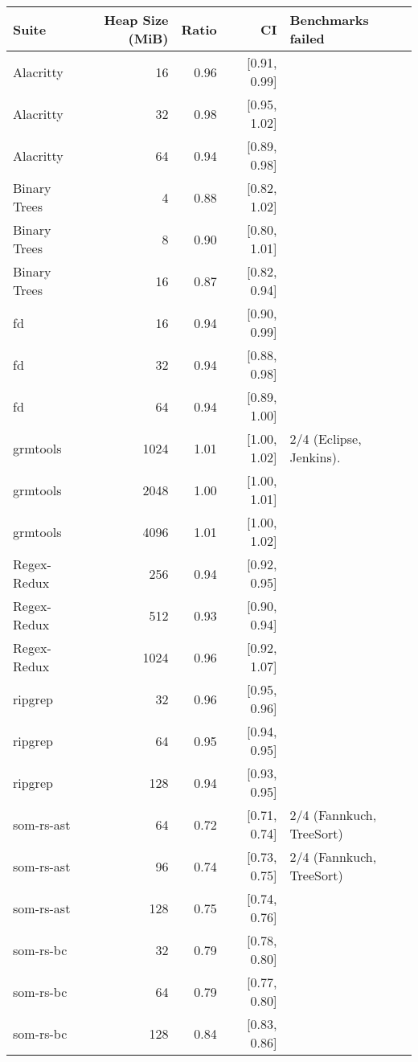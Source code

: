 \begin{tabular}{lrrrl}
    Suite         & Heap Size (MiB) & Ratio & CI & Benchmarks failed \\
\hline
Alacritty      & 16  & 0.96 & \scriptsize\textcolor{gray!60}{[0.91, 0.99]} & \\
Alacritty      & 32  & 0.98 & \scriptsize\textcolor{gray!60}{[0.95, 1.02]} & \\
Alacritty      & 64 & 0.94 & \scriptsize\textcolor{gray!60}{[0.89, 0.98]} & \\
\midrule
Binary Trees   & 4  & 0.88 & \scriptsize\textcolor{gray!60}{[0.82, 1.02]} & \\
Binary Trees   & 8  & 0.90 & \scriptsize\textcolor{gray!60}{[0.80, 1.01]} & \\
Binary Trees   & 16 & 0.87 & \scriptsize\textcolor{gray!60}{[0.82, 0.94]} & \\
\midrule
fd             & 16  & 0.94 & \scriptsize\textcolor{gray!60}{[0.90, 0.99]} & \\
fd             & 32  & 0.94 & \scriptsize\textcolor{gray!60}{[0.88, 0.98]} & \\
fd             & 64 & 0.94 & \scriptsize\textcolor{gray!60}{[0.89, 1.00]} & \\
\midrule
grmtools       & 1024  & 1.01 & \scriptsize\textcolor{gray!60}{[1.00, 1.02]} & 2/4 (Eclipse, Jenkins).  \\
grmtools       & 2048  & 1.00 & \scriptsize\textcolor{gray!60}{[1.00, 1.01]} & \\
grmtools       & 4096 & 1.01 & \scriptsize\textcolor{gray!60}{[1.00, 1.02]} & \\
\midrule
Regex-Redux    & 256  & 0.94 & \scriptsize\textcolor{gray!60}{[0.92, 0.95]} & \\
Regex-Redux    & 512  & 0.93 & \scriptsize\textcolor{gray!60}{[0.90, 0.94]} & \\
Regex-Redux    & 1024 & 0.96 & \scriptsize\textcolor{gray!60}{[0.92, 1.07]} & \\
\midrule
ripgrep        & 32  & 0.96 & \scriptsize\textcolor{gray!60}{[0.95, 0.96]} & \\
ripgrep        & 64  & 0.95 & \scriptsize\textcolor{gray!60}{[0.94, 0.95]} & \\
ripgrep        & 128 & 0.94 & \scriptsize\textcolor{gray!60}{[0.93, 0.95]} & \\
\midrule
    som-rs-ast     & 64  & 0.72 & \scriptsize\textcolor{gray!60}{[0.71, 0.74]} & 2/4 (Fannkuch, TreeSort) \\
    som-rs-ast     & 96  & 0.74 & \scriptsize\textcolor{gray!60}{[0.73, 0.75]} & 2/4 (Fannkuch, TreeSort) \\
som-rs-ast     & 128 & 0.75 & \scriptsize\textcolor{gray!60}{[0.74, 0.76]} & \\
\midrule
som-rs-bc      & 32  & 0.79 & \scriptsize\textcolor{gray!60}{[0.78, 0.80]} & \\
som-rs-bc      & 64  & 0.79 & \scriptsize\textcolor{gray!60}{[0.77, 0.80]} & \\
som-rs-bc      & 128 & 0.84 & \scriptsize\textcolor{gray!60}{[0.83, 0.86]} & \\
\bottomrule
\end{tabular}

